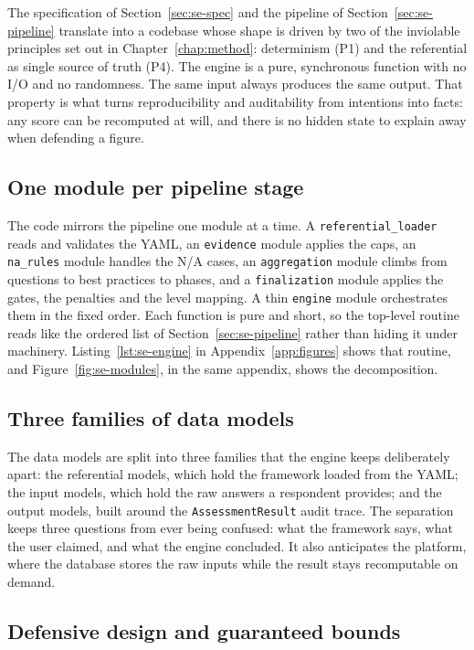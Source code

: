 The specification of Section~\ref{sec:se-spec} and the pipeline of
Section~\ref{sec:se-pipeline} translate into a codebase whose shape is driven by two
of the inviolable principles set out in Chapter~\ref{chap:method}: determinism (P1)
and the referential as single source of truth (P4). The engine is a pure,
synchronous function with no I/O and no randomness. The same input always produces
the same output. That property is what turns reproducibility and auditability from
intentions into facts: any score can be recomputed at will, and there is no hidden
state to explain away when defending a figure.

\subsection{One module per pipeline stage}

The code mirrors the pipeline one module at a time. A \texttt{referential\_loader}
reads and validates the YAML, an \texttt{evidence} module applies the caps, an
\texttt{na\_rules} module handles the N/A cases, an \texttt{aggregation} module
climbs from questions to best practices to phases, and a \texttt{finalization}
module applies the gates, the penalties and the level mapping. A thin
\texttt{engine} module orchestrates them in the fixed order. Each function is pure
and short, so the top-level routine reads like the ordered list of
Section~\ref{sec:se-pipeline} rather than hiding it under machinery.
Listing~\ref{lst:se-engine} in Appendix~\ref{app:figures} shows that routine, and
Figure~\ref{fig:se-modules}, in the same appendix, shows the decomposition.

\subsection{Three families of data models}

The data models are split into three families that the engine keeps deliberately
apart: the referential models, which hold the framework loaded from the YAML; the
input models, which hold the raw answers a respondent provides; and the output
models, built around the \texttt{AssessmentResult} audit trace. The separation keeps
three questions from ever being confused: what the framework says, what the user
claimed, and what the engine concluded. It also anticipates the platform, where the
database stores the raw inputs while the result stays recomputable on demand.

\subsection{Defensive design and guaranteed bounds}


